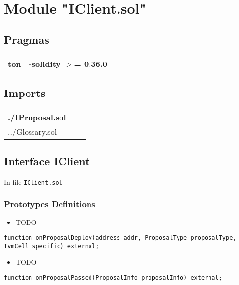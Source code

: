 
\section{Module "IClient.sol"}


\subsection{Pragmas}


\noindent\begin{tabular}{|l|l|p{5cm}|}\hline
ton & -solidity $>$= 0.36.0 &\\\hline
\end{tabular}


\subsection{Imports}


\noindent\begin{tabular}{|l|l|p{5cm}|}\hline
./IProposal.sol &\\\hline
../Glossary.sol &\\\hline
\end{tabular}


\subsection{Interface IClient}

\minitoc

In file {\tt IClient.sol}

\subsubsection{Prototypes Definitions}

\begin{itemize}
\item TODO
\end{itemize}

\begin{lstlisting}[firstnumber=9]
    function onProposalDeploy(address addr, ProposalType proposalType, TvmCell specific) external;
\end{lstlisting}
\begin{itemize}
\item TODO
\end{itemize}

\begin{lstlisting}[firstnumber=8]
    function onProposalPassed(ProposalInfo proposalInfo) external;
\end{lstlisting}
